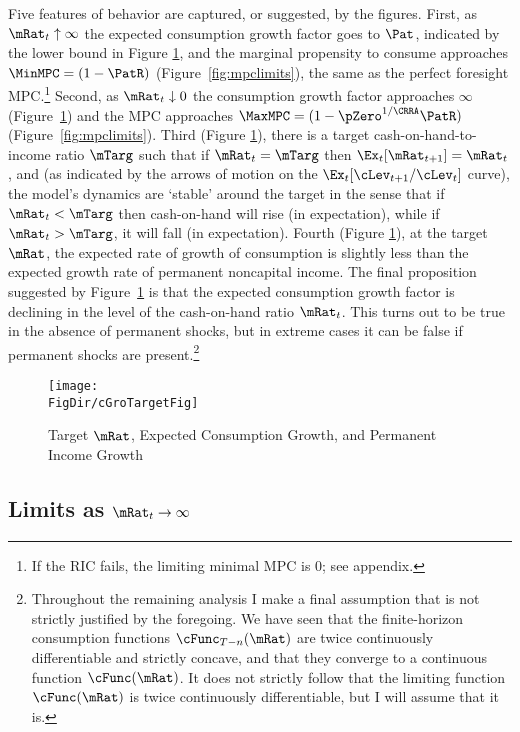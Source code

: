 \documentclass[titlepage]{\econtex}\providecommand{\texname}{BufferStockTheory}%
\providecommand{\FigDir}{Figures}
\renewcommand{\FigDir}{Code/Python/Figures}
\begin{document}
{Five features of behavior are captured, or suggested, by the
figures. First, as $\mRat_{t} \uparrow \infty$ the expected
consumption growth factor goes to ${\Pat}$, indicated by the lower
bound in Figure \ref{fig:cGroTargetFig}, and the marginal propensity
to consume approaches $\MinMPC=(1-\PatR)$
(Figure~\ref{fig:mpclimits}), the same as the perfect foresight MPC.\footnote{If the RIC fails, the limiting minimal MPC is 0; see appendix.}  Second, as $\mRat_t \downarrow 0$ the consumption
growth factor approaches $\infty$ (Figure~\ref{fig:cGroTargetFig}) and
the MPC approaches $\MaxMPC=(1-\pZero^{1/\CRRA}\PatR)$ (Figure~\ref{fig:mpclimits}).  Third (Figure
\ref{fig:cGroTargetFig}), there is a target cash-on-hand-to-income
ratio $\mTarg$ such that if $\mRat_t = \mTarg$ then $\Ex_t [
{\mRat}_{t+1}] = \mRat_t$, and (as indicated by the arrows of motion
on the $\Ex_{t}[\cLev_{t+1}/\cLev_{t}]$ curve), the model's dynamics
are `stable' around the target in the sense that if $\mRat_{t} <
\mTarg$ then cash-on-hand will rise (in expectation), while if
$\mRat_{t} > \mTarg$, it will fall (in expectation).  Fourth (Figure
\ref{fig:cGroTargetFig}), at the target $\mRat$, the expected rate of
growth of consumption is slightly less than the expected growth rate
of permanent noncapital income. The final proposition suggested by
Figure~\ref{fig:cGroTargetFig} is that the expected consumption growth
factor is declining in the level of the cash-on-hand ratio
$\mRat_{t}$.  This turns out to be true in the absence of permanent
shocks, but in extreme cases it can be false if permanent shocks are
present.\footnote{Throughout the remaining analysis I make a final
  assumption that is not strictly justified by the foregoing.  We have
  seen that the finite-horizon consumption functions
  $\cFunc_{T-n}(\mRat)$ are twice continuously differentiable and
  strictly concave, and that they converge to a continuous function
  $\cFunc(\mRat)$.  It does not strictly follow that the limiting
  function $\cFunc(\mRat)$ is twice continuously differentiable, but I
  will assume that it is.}


\begin{figure}[tbp]
\centerline{\texttt{[image: \\FigDir/cGroTargetFig]}}
\caption{Target $\mRat$, Expected Consumption Growth, and Permanent Income Growth}
\label{fig:cGroTargetFig}
\end{figure}

\subsection{Limits as $\mRat_t \rightarrow \infty$}

}
\end{document}
